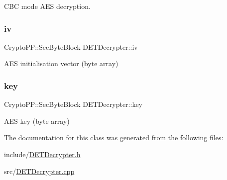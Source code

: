 C\+BC mode A\+ES decryption. \mbox{\label{classDETDecrypter_a601eb88318e103fd40ad1864f951ab54}} 
\subsubsection{\texorpdfstring{iv}{iv}}
{\footnotesize\ttfamily Crypto\+P\+P\+::\+Sec\+Byte\+Block D\+E\+T\+Decrypter\+::iv\hspace{0.3cm}{\ttfamily [private]}}

A\+ES initialisation vector (byte array) \mbox{\label{classDETDecrypter_a44a998e051bc9efc04295b9401ec716e}} 
\subsubsection{\texorpdfstring{key}{key}}
{\footnotesize\ttfamily Crypto\+P\+P\+::\+Sec\+Byte\+Block D\+E\+T\+Decrypter\+::key\hspace{0.3cm}{\ttfamily [private]}}

A\+ES key (byte array) 

The documentation for this class was generated from the following files\+:\begin{DoxyCompactItemize}
\item 
include/\hyperlink{DETDecrypter_8h}{D\+E\+T\+Decrypter.\+h}\item 
src/\hyperlink{DETDecrypter_8cpp}{D\+E\+T\+Decrypter.\+cpp}\end{DoxyCompactItemize}
